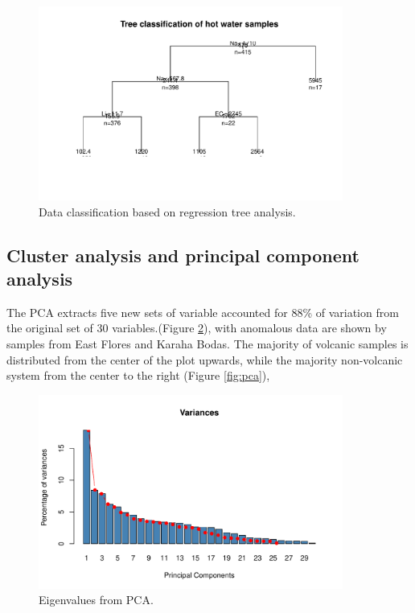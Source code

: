 \documentclass{sciposter}
\begin{document}
\begin{multicols}{3}
\begin{figure}[h]
\begin{center}
\includegraphics[width=10cm]{treefit_x.pdf}
\end{center}
\caption{ \label{fig:tree} Data classification based on regression tree analysis. }
\end{figure}

\subsection{Cluster analysis and principal component analysis}
The PCA extracts five new sets of variable accounted for 88\% of variation from the original set of 30 variables.(Figure \ref{fig:eigen}), with anomalous data are shown by samples from East Flores and Karaha Bodas. The majority of volcanic samples is  distributed from the center of the plot upwards, while the majority non-volcanic system from the center to the right (Figure \ref{fig:pca}), 

\begin{figure}[h]
\begin{center}
\includegraphics[width=10cm]{eigen_x.pdf}
\end{center}
\caption{ \label{fig:eigen} Eigenvalues from PCA. }
\end{figure}


\end{multicols}
\end{document}
